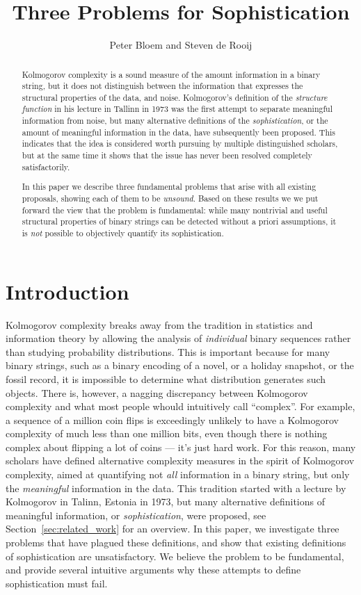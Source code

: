 \documentclass{style/llncs}
\title{Three Problems for Sophistication}
\author{Peter Bloem and Steven de Rooij}
\institute{
  System and Network Engineering Group, \\University of Amsterdam, the Netherlands\\
  \email{uva@peterbloem.nl, steven.de.rooij@gmail.com}
}
\begin{document}
\maketitle

\begin{abstract}
Kolmogorov complexity is a sound measure of the amount information in a binary string, but it does not distinguish between the information that expresses the structural properties of the data, and noise. Kolmogorov's definition of the \emph{structure function} in his lecture in Tallinn in 1973 was the first attempt to separate meaningful information from noise, but many alternative definitions of the \emph{sophistication}, or the amount of meaningful information in the data, have subsequently been proposed. This indicates that the idea is considered worth pursuing by multiple distinguished scholars, but at the same time it shows that the issue has never been resolved completely satisfactorily.

In this paper we describe three fundamental problems that arise with all existing proposals, showing each of them to be \emph{unsound}. Based on these results we we put forward the view that the problem is fundamental: while many nontrivial and useful structural properties of binary strings can be detected without a priori assumptions, it is \emph{not} possible to objectively quantify its sophistication.
\end{abstract}

\section{Introduction}

Kolmogorov complexity breaks away from the tradition in statistics and information theory by allowing the analysis of \emph{individual} binary sequences rather than studying probability distributions. This is important because for many binary strings, such as a binary encoding of a novel, or a holiday snapshot, or the fossil record, it is impossible to determine what distribution generates such objects. There is, however, a nagging discrepancy between Kolmogorov complexity and what most people whould intuitively call ``complex''. For example, a sequence of a million coin flips is exceedingly unlikely to have a Kolmogorov complexity of much less than one million bits, even though there is nothing complex about flipping a lot of coins --- it's just hard work. For this reason, many scholars have defined alternative complexity measures in the spirit of Kolmogorov complexity, aimed at quantifying not \emph{all} information in a binary string, but only the \emph{meaningful} information in the data. This tradition started with a lecture by Kolmogorov in Talinn, Estonia in 1973, but many alternative definitions of meaningful information, or \emph{sophistication}, were proposed, see Section~\ref{sec:related_work} for an overview. In this paper, we investigate three problems that have plagued these definitions, and show that existing definitions of sophistication are unsatisfactory. We believe the problem to be fundamental, and provide several intuitive arguments why these attempts to define sophistication must fail.
\end{document}
